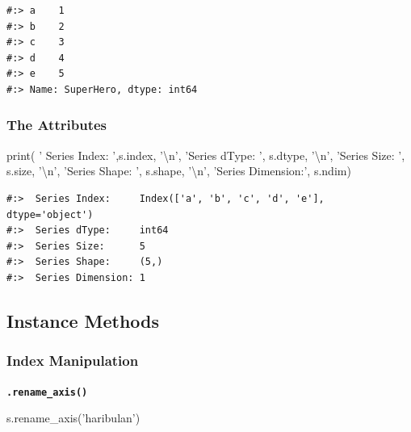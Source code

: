 \documentclass[
]{book}
\newenvironment{Shaded}{\begin{snugshade}}{\end{snugshade}}
\newcommand{\BuiltInTok}[1]{#1}
\newcommand{\CharTok}[1]{\textcolor[rgb]{0.5,0.5,0.5}{#1}}
\newcommand{\NormalTok}[1]{#1}
\newcommand{\StringTok}[1]{\textcolor[rgb]{0.5,0.5,0.5}{#1}}
\begin{document}
\begin{verbatim}
#:> a    1
#:> b    2
#:> c    3
#:> d    4
#:> e    5
#:> Name: SuperHero, dtype: int64
\end{verbatim}

\hypertarget{the-attributes}{%
\subsubsection{The Attributes}\label{the-attributes}}

\begin{Shaded}
\begin{Highlighting}[]
\BuiltInTok{print}\NormalTok{( }\StringTok{' Series Index:    '}\NormalTok{,s.index, }\StringTok{'}\CharTok{\textbackslash{}n}\StringTok{'}\NormalTok{,}
       \StringTok{'Series dType:    '}\NormalTok{, s.dtype, }\StringTok{'}\CharTok{\textbackslash{}n}\StringTok{'}\NormalTok{,}
       \StringTok{'Series Size:     '}\NormalTok{, s.size, }\StringTok{'}\CharTok{\textbackslash{}n}\StringTok{'}\NormalTok{,}
       \StringTok{'Series Shape:    '}\NormalTok{, s.shape, }\StringTok{'}\CharTok{\textbackslash{}n}\StringTok{'}\NormalTok{,}
       \StringTok{'Series Dimension:'}\NormalTok{, s.ndim)}
\end{Highlighting}
\end{Shaded}

\begin{verbatim}
#:>  Series Index:     Index(['a', 'b', 'c', 'd', 'e'], dtype='object') 
#:>  Series dType:     int64 
#:>  Series Size:      5 
#:>  Series Shape:     (5,) 
#:>  Series Dimension: 1
\end{verbatim}

\hypertarget{instance-methods-2}{%
\subsection{Instance Methods}\label{instance-methods-2}}

\hypertarget{index-manipulation}{%
\subsubsection{Index Manipulation}\label{index-manipulation}}

\textbf{\texttt{.rename\_axis()}}

\begin{Shaded}
\begin{Highlighting}[]
\NormalTok{s.rename_axis(}\StringTok{'haribulan'}\NormalTok{)}
\end{Highlighting}
\end{Shaded}
\end{document}
